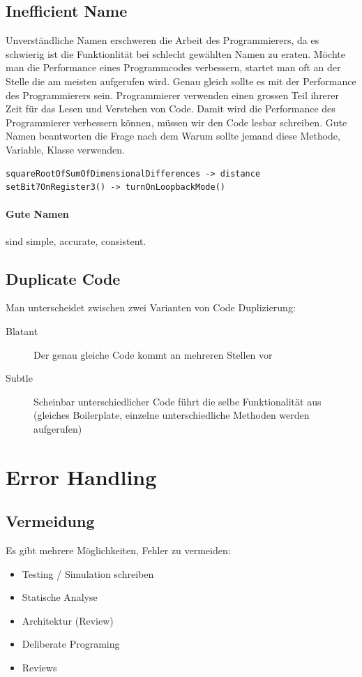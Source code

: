 \subsection{Inefficient Name}
Unverständliche Namen erschweren die Arbeit des Programmierers, da es schwierig ist die Funktionlität bei schlecht gewählten Namen zu eraten. Möchte man die Performance eines Programmcodes verbessern, startet man oft an der Stelle die am meisten aufgerufen wird. Genau gleich sollte es mit der Performance des Programmierers sein. Programmierer verwenden einen grossen Teil ihrerer Zeit für das Lesen und Verstehen von Code. Damit wird die Performance des Programmierer verbessern können, müssen wir den Code lesbar schreiben. Gute Namen beantworten die Frage nach dem Warum sollte jemand diese Methode, Variable, Klasse verwenden.

\begin{lstlisting}
squareRootOfSumOfDimensionalDifferences -> distance
setBit7OnRegister3() -> turnOnLoopbackMode()
\end{lstlisting}

\paragraph{Gute Namen} sind simple, accurate, consistent.

\subsection{Duplicate Code}
Man unterscheidet zwischen zwei Varianten von Code Duplizierung:
\begin{description}
	\item[Blatant] Der genau gleiche Code kommt an mehreren Stellen vor
	\item[Subtle] Scheinbar unterschiedlicher Code führt die selbe Funktionalität aus (gleiches Boilerplate, einzelne unterschiedliche Methoden werden aufgerufen)
\end{description}

\section{Error Handling}

\subsection{Vermeidung}
Es gibt mehrere Möglichkeiten, Fehler zu vermeiden:
\begin{itemize}
	\item Testing / Simulation schreiben
	\item Statische Analyse
	\item Architektur (Review)
	\item Deliberate Programing
	\item Reviews
\end{itemize}

